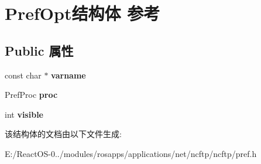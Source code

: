 \hypertarget{struct_pref_opt}{}\section{Pref\+Opt结构体 参考}
\label{struct_pref_opt}
\subsection*{Public 属性}
\begin{DoxyCompactItemize}
\item 
\mbox{\label{struct_pref_opt_a5146963c38bacc9fe75c7783b160d6e0}} 
const char $\ast$ {\bfseries varname}
\item 
\mbox{\label{struct_pref_opt_adbd518a2d72ef109f94fc671d04f03a5}} 
Pref\+Proc {\bfseries proc}
\item 
\mbox{\label{struct_pref_opt_aca79ed3c5ee0dc2c32a166fb48fbb350}} 
int {\bfseries visible}
\end{DoxyCompactItemize}


该结构体的文档由以下文件生成\+:\begin{DoxyCompactItemize}
\item 
E\+:/\+React\+O\+S-\/0../modules/rosapps/applications/net/ncftp/ncftp/pref.\+h\end{DoxyCompactItemize}
